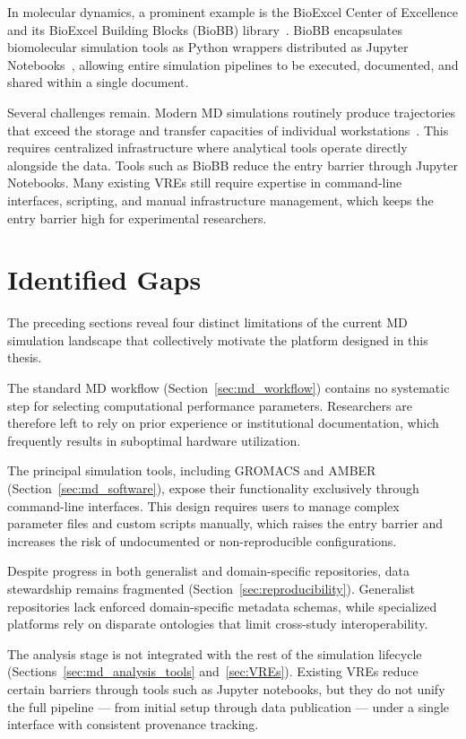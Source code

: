 \documentclass[
  digital,     %
  color,       %
  oneside,     %
  nosansbold,  %
  nocolorbold, %
  lof,         %
  lot,         %
]{fithesis4}
\begin{document}
In molecular dynamics, a prominent example is the BioExcel Center of Excellence and its BioExcel Building Blocks (BioBB) library~\cite{BioBB}. BioBB encapsulates biomolecular simulation tools as Python wrappers distributed as Jupyter Notebooks~\cite{jupyter}, allowing entire simulation pipelines to be executed, documented, and shared within a single document.

Several challenges remain. Modern MD simulations routinely produce trajectories that exceed the storage and transfer capacities of individual workstations~\cite{hpc_approaches_for_md}. This requires centralized infrastructure where analytical tools operate directly alongside the data. Tools such as BioBB reduce the entry barrier through Jupyter Notebooks. Many existing VREs still require expertise in command-line interfaces, scripting, and manual infrastructure management, which keeps the entry barrier high for experimental researchers.

\section{Identified Gaps}
\label{sec:identified_gaps}

The preceding sections reveal four distinct limitations of the current MD simulation landscape that collectively motivate the platform designed in this thesis.

The standard MD workflow (Section~\ref{sec:md_workflow}) contains no systematic step for selecting computational performance parameters. Researchers are therefore left to rely on prior experience or institutional documentation, which frequently results in suboptimal hardware utilization.

The principal simulation tools, including GROMACS and AMBER (Section~\ref{sec:md_software}), expose their functionality exclusively through command-line interfaces. This design requires users to manage complex parameter files and custom scripts manually, which raises the entry barrier and increases the risk of undocumented or non-reproducible configurations.

Despite progress in both generalist and domain-specific repositories, data stewardship remains fragmented (Section~\ref{sec:reproducibility}). Generalist repositories lack enforced domain-specific metadata schemas, while specialized platforms rely on disparate ontologies that limit cross-study interoperability.

The analysis stage is not integrated with the rest of the simulation lifecycle (Sections~\ref{sec:md_analysis_tools} and~\ref{sec:VREs}). Existing VREs reduce certain barriers through tools such as Jupyter notebooks, but they do not unify the full pipeline --- from initial setup through data publication --- under a single interface with consistent provenance tracking.
\end{document}
